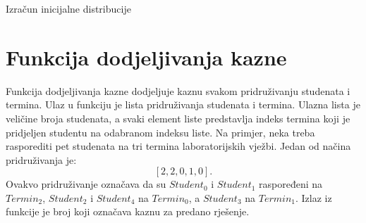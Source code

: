 \documentclass[times, utf8, zavrsni]{fer}
\begin{document}
\begin{algorithm}
  \caption{Izračun inicijalne distribucije}
  \label{algo:inicijalna_distribucija}
  \begin{algorithmic}



      \ENDIF

      \ENDIF

      \ENDIF
    \ENDFOR
  \ENDFOR


    \ENDFOR
  \ENDFOR

    \ENDFOR
  \ENDFOR



  \end{algorithmic}
  \end{algorithm}




\section{Funkcija dodjeljivanja kazne}
Funkcija dodjeljivanja kazne dodjeljuje kaznu svakom pridruživanju studenata i termina. Ulaz u funkciju je
lista pridruživanja studenata i termina. Ulazna lista je veličine broja studenata, a svaki element liste predstavlja
indeks termina koji je pridjeljen studentu na odabranom indeksu liste. Na primjer, neka treba rasporediti pet studenata
na tri termina laboratorijskih vježbi. Jedan od načina pridruživanja je:
$$
[2, 2, 0, 1, 0].
$$
Ovakvo pridruživanje označava da su $Student_0$ i $Student_1$ raspoređeni na $Termin_2$,
$Student_2$ i $Student_4$ na $Termin_0$, a $Student_3$ na $Termin_1$. Izlaz iz funkcije je broj koji označava kaznu
za predano rješenje.
\end{document}
